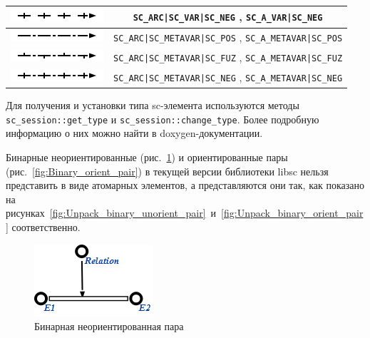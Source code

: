 \begin{table}[ht]
\begin{tabular}{|c|c|}
    \hline
	\includegraphics{images/4/scg2sc/pair_var_perm_neg} & \verb+SC_ARC|SC_VAR|SC_NEG+
    , \verb+SC_A_VAR|SC_NEG+ \\
    
    \hline
	\includegraphics{images/4/scg2sc/pair_meta_perm_pos} & \verb+SC_ARC|SC_METAVAR|SC_POS+
    , \verb+SC_A_METAVAR|SC_POS+ \\
    
    \hline
	\includegraphics{images/4/scg2sc/pair_meta_perm_fuz} & \verb+SC_ARC|SC_METAVAR|SC_FUZ+
    , \verb+SC_A_METAVAR|SC_FUZ+ \\
    
    \hline
	\includegraphics{images/4/scg2sc/pair_meta_perm_neg} & \verb+SC_ARC|SC_METAVAR|SC_NEG+
    , \verb+SC_A_METAVAR|SC_NEG+ \\
    
    \hline
  \end{tabular}
  \label{tab:SCgType2SCType}
\end{table}

Для получения и установки типа sc-элемента используются методы
\lstinline{sc_session::get_type} и
\lstinline{sc_session::change_type}. Более подробную информацию о них
можно найти в doxygen-документации.

Бинарные неориентированные (рис.~\ref{fig:Binary_unorient_pair}) и
ориентированные пары (рис.~\ref{fig:Binary_orient_pair}) в текущей
версии библиотеки libsc нельзя представить в виде атомарных элементов,
а представляются они так, как показано на
рисунках~\ref{fig:Unpack_binary_unorient_pair}~и~\ref{fig:Unpack_binary_orient_pair}
соответственно.

\begin{figure}[h]
  \centering
  \includegraphics{images/4/scg2sc/Binary_unorient_pair}
  \caption{Бинарная неориентированная пара}
  \label{fig:Binary_unorient_pair}
\end{figure}

